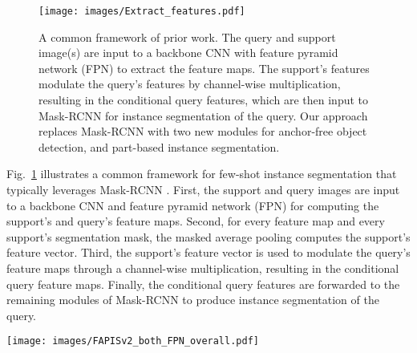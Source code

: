 \documentclass[final]{cvpr}
\def\Approach{FAPIS}
\begin{document}
\begin{figure}[h!]
    \centering
    \texttt{[image: images/Extract\_features.pdf]}
    \caption{A common framework of prior work. The query and support image(s) are input to a backbone CNN with feature pyramid network (FPN) to extract the feature maps. The support's features modulate the query's features by channel-wise multiplication, resulting in the conditional query features, which are then input to Mask-RCNN for instance segmentation of the query. Our approach replaces Mask-RCNN with two new modules for anchor-free object detection, and part-based instance segmentation.}
    \label{fig:feature_extraction}
\end{figure}


Fig.~\ref{fig:feature_extraction} illustrates a common framework for few-shot instance segmentation that typically leverages Mask-RCNN \cite{he2017mask,  yanICCV19metarcnn, michaelis2018one}. 
First, the support and query images are input to a backbone CNN and feature pyramid network (FPN) \cite{lin2017feature} for computing the support's and query's feature maps. Second, for every feature map and every support's segmentation mask, the masked average pooling computes the support's feature vector. Third,
the support's feature vector is used to modulate the query's feature maps through a channel-wise multiplication, resulting in the conditional query feature maps. Finally, the conditional query features are forwarded to the remaining modules of Mask-RCNN to produce instance segmentation of the query.

\begin{figure*}[h!]
    \centering
    \texttt{[image: images/FAPISv2\_both\_FPN\_overall.pdf]}
    \caption{Our \Approach~uses the same feature maps as in Fig.~\ref{fig:feature_extraction}, and extends prior work with two new modules: anchor-free object detector (AFD) and  part-based instance segmentor (PIS). The AFD produces three types of dense predictions 
    for every location $(x,y)$ in the feature map: (a) Figure-ground (FG) classification score; 
    (b) Location of the closest bounding box to $(x,y)$; 
    (c) Relative importance of the latent parts for segmentation of the bounding box closest to $(x,y)$. 
    The PIS consists of the PartNet and Part Assembling Module (PAM). The PartNet predicts activation maps of the latent parts. After NMS selects the top scoring bounding boxes, for every box $n$,  the PAM fuses the part-activation maps according to the predicted part importance for the box $n$, resulting in the instance segmentation  $m_n$.}
    \label{fig:part_assembling_module}
\end{figure*}
\end{document}
